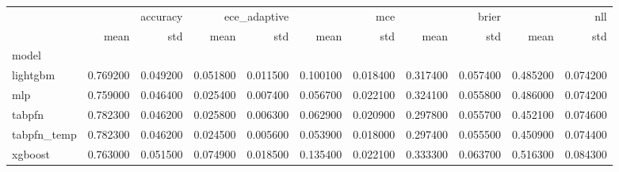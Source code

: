 \begin{tabular}{lrrrrrrrrrr}
\toprule
 & \multicolumn{2}{r}{accuracy} & \multicolumn{2}{r}{ece_adaptive} & \multicolumn{2}{r}{mce} & \multicolumn{2}{r}{brier} & \multicolumn{2}{r}{nll} \\
 & mean & std & mean & std & mean & std & mean & std & mean & std \\
model &  &  &  &  &  &  &  &  &  &  \\
\midrule
lightgbm & 0.769200 & 0.049200 & 0.051800 & 0.011500 & 0.100100 & 0.018400 & 0.317400 & 0.057400 & 0.485200 & 0.074200 \\
mlp & 0.759000 & 0.046400 & 0.025400 & 0.007400 & 0.056700 & 0.022100 & 0.324100 & 0.055800 & 0.486000 & 0.074200 \\
tabpfn & 0.782300 & 0.046200 & 0.025800 & 0.006300 & 0.062900 & 0.020900 & 0.297800 & 0.055700 & 0.452100 & 0.074600 \\
tabpfn_temp & 0.782300 & 0.046200 & 0.024500 & 0.005600 & 0.053900 & 0.018000 & 0.297400 & 0.055500 & 0.450900 & 0.074400 \\
xgboost & 0.763000 & 0.051500 & 0.074900 & 0.018500 & 0.135400 & 0.022100 & 0.333300 & 0.063700 & 0.516300 & 0.084300 \\
\bottomrule
\end{tabular}
